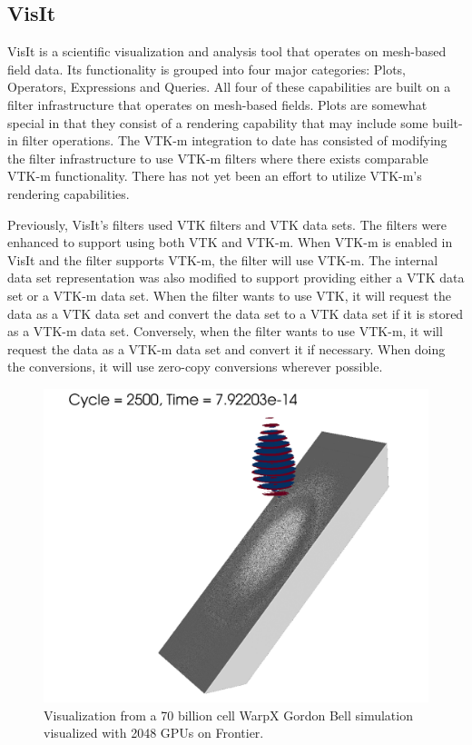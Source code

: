 \subsection{VisIt}

VisIt is a scientific visualization and analysis tool that operates on mesh-based field data. Its functionality is grouped into four major categories: Plots, Operators, Expressions and Queries. All four of these capabilities are built on a filter infrastructure that operates on mesh-based fields. Plots are somewhat special in that they consist of a rendering capability that may include some built-in filter operations. The VTK-m integration to date has consisted of modifying the filter infrastructure to use VTK-m filters where there exists comparable VTK-m functionality. There has not yet been an effort to utilize VTK-m's rendering capabilities.

Previously, VisIt's filters used VTK filters and VTK data sets. The filters were enhanced to support using both VTK and VTK-m. When VTK-m is enabled in VisIt and the filter supports VTK-m, the filter will use VTK-m. The internal data set representation was also modified to support providing either a VTK data set or a VTK-m data set. When the filter wants to use VTK, it will request the data as a VTK data set and convert the data set to a VTK data set if it is stored as a VTK-m data set. Conversely, when the filter wants to use VTK-m, it will request the data as a VTK-m data set and convert it if necessary. When doing the conversions, it will use zero-copy conversions wherever possible.

\begin{figure}[htb]
  \includegraphics[width=\linewidth]{figures/visit_warpx_frontier.png}
  \caption{Visualization from a 70 billion cell WarpX Gordon Bell simulation~\cite{FedeliHuebl2022} visualized with 2048 GPUs on Frontier.}
  \label{fig:visit_warpx_frontier}
\end{figure}

